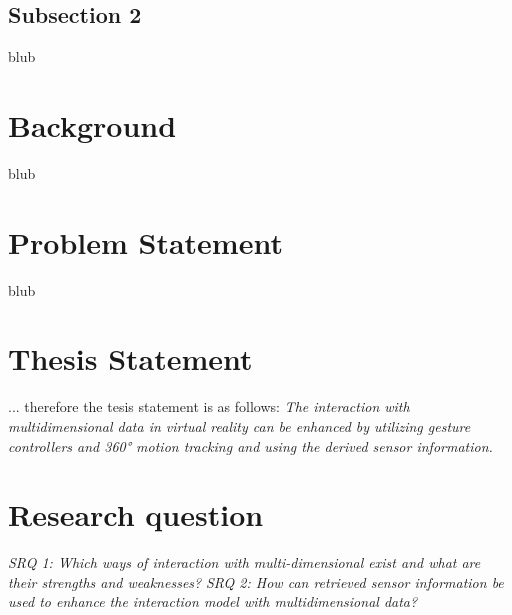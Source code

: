 \subsection{Subsection 2}

blub



\section{Background}

blub



\section{Problem Statement}

blub



\section{Thesis Statement}
... therefore the tesis statement is as follows: \newline
\textit{The interaction with multidimensional data in virtual reality can be enhanced by utilizing gesture controllers and 360° motion tracking and using the derived sensor information.}


\section{Research question}

\textit{SRQ 1: Which ways of interaction with multi-dimensional exist and what are their strengths and weaknesses?}
\newline
\textit{SRQ 2: How can retrieved sensor information be used to enhance the interaction model with multidimensional data?}



